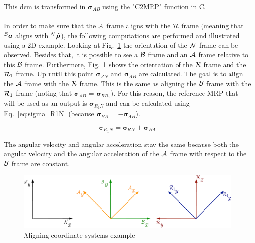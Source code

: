 This dcm is transformed in ${\bm \sigma}_{AB}$ using the "C2MRP" function in C. \\
\\
In order to make sure that the ${\cal A}$ frame aligns with the ${\cal R}$ frame (meaning that $^{\cal B}{\bm a}$ aligns with $^{\cal N}\hat{{\bm \rho}}$), the following computations are performed and illustrated using a 2D example. Looking at Fig.~\ref{fig:coordinate_systems} the orientation of the ${\cal N}$ frame can be observed. Besides that, it is possible to see a ${\cal B}$ frame and an ${\cal A}$ frame relative to this ${\cal B}$ frame. Furthermore, Fig.~\ref{fig:coordinate_systems} shows the orientation of the ${\cal R}$ frame and the ${\cal R}_{1}$ frame. Up until this point ${\bm \sigma}_{RN}$ and ${\bm \sigma}_{AB}$ are calculated. The goal is to align the ${\cal A}$ frame with the ${\cal R}$ frame. This is the same as aligning the ${\cal B}$ frame with the ${\cal R}_{1}$ frame (noting that ${\bm \sigma}_{AB}$ = ${\bm \sigma}_{RR_{1}}$). For this reason, the reference MRP that will be used as an output is ${\bm \sigma}_{R_{1}N}$ and can be calculated using Eq.~\eqref{eq:sigma_R1N} (because ${\bm \sigma}_{BA} = - {\bm \sigma}_{AB}$).

\begin{equation}
    {\bm \sigma}_{R_{1}N} = {\bm \sigma}_{RN} + {\bm \sigma}_{BA}
    \label{eq:sigma_R1N}
\end{equation}

The angular velocity and angular acceleration stay the same because both the angular velocity and the angular acceleration of the ${\cal A}$ frame with respect to the ${\cal B}$ frame are constant.

\begin{figure}[htb]
	\centerline{
	\includegraphics[scale=0.5]{Figures/Coordinate_systems.pdf}
	}
	\caption{Aligning coordinate systems example}
	\label{fig:coordinate_systems}
\end{figure}